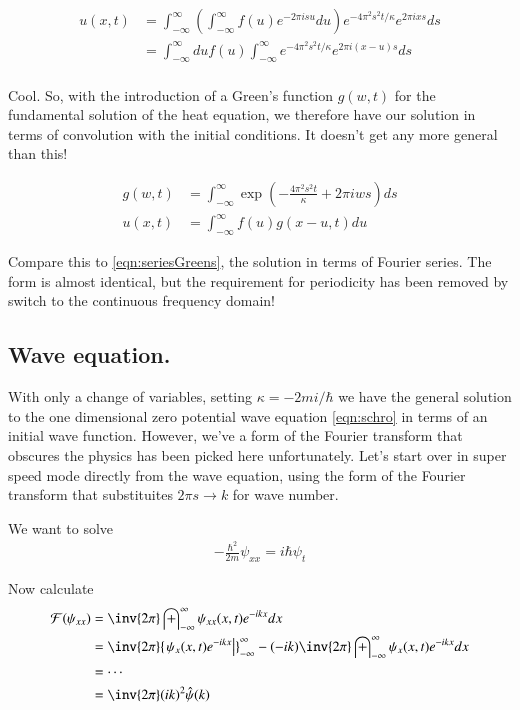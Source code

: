 \documentclass{article}
\newcommand{\FF}[0]{\mathcal{F}}
\newcommand{\IIinf}[0]{ \int_{-\infty}^\infty }
\begin{document}
\begin{align*}
u(x,t) 
&= 
\IIinf \left( 
\IIinf f(u) e^{-2 \pi i s u } du \right) e^{ -4 \pi^2 s^2 t/ \kappa } e^{2 \pi i x s } ds  \\
&= 
\IIinf du f(u) 
\IIinf e^{ -4 \pi^2 s^2 t/ \kappa } e^{2 \pi i (x - u) s } ds  \\
\end{align*}

Cool.  So, with the introduction of a Green's function $g(w,t)$ for the fundamental solution of the heat equation, we therefore have
our solution in terms of convolution with the initial conditions.  It doesn't get any more general than this!

\begin{align}
g(w,t) &= 
\IIinf \exp\left( -\frac{4 \pi^2 s^2 t}{\kappa} + 2 \pi i w s \right) ds \\
u(x,t) &= \IIinf f(u) g( x - u, t) du
\end{align}

Compare this to \ref{eqn:seriesGreens}, the solution in terms of Fourier series.  The form is almost identical, but the requirement for periodicity has been removed by switch to the continuous frequency domain!

\subsection{ Wave equation. }

With only a change of variables, setting $\kappa = - 2 m i /\hbar$ we have the general solution to the one dimensional zero potential wave equation \ref{eqn:schro} in terms of an initial wave function.  However, we've a form of the Fourier transform that obscures the physics has been picked here unfortunately.  Let's start over in super speed mode directly from the wave equation, using the form of the Fourier transform that substituites $2\pi s \rightarrow k$ for wave number.

We want to solve
\begin{align*}
-\frac{\hbar^2}{2m} \psi_{xx} = i \hbar \psi_t
\end{align*}

Now calculate
\begin{align*}
\FF(\psi_{xx}) 
&= \inv{2\pi} \IIinf \psi_{xx}(x,t) e^{-i k x} dx \\
&= 
\inv{2\pi} {\left.\psi_{x}(x,t) e^{-i k x} \right\vert}_{-\infty}^\infty 
-(- i k) \inv{2\pi} \IIinf \psi_{x}(x,t) e^{-i k x} dx \\
&= \cdots \\
&= \inv{2\pi} (i k)^2 \hat{\psi}(k)
\end{align*}
\end{document}
